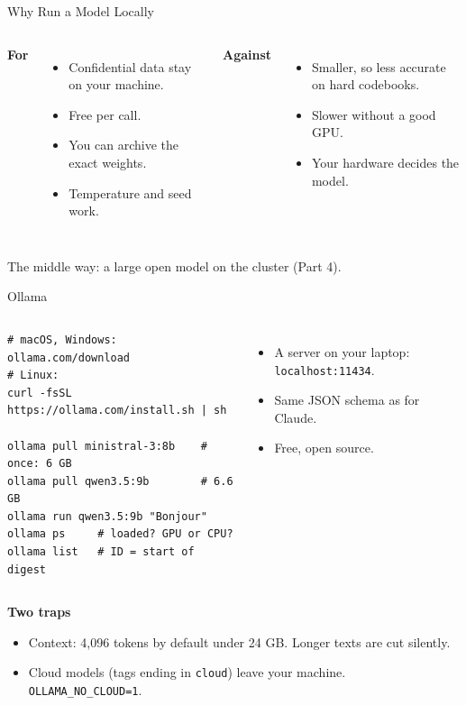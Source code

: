 \documentclass[svgnames,x11names,dvipsnames]{beamer}
\begin{document}
\begin{frame}{Why Run a Model Locally}
\small
\begin{columns}[T]
\textbf{For}
\begin{itemize}
    \setlength{\itemsep}{5pt}
    \item Confidential data stay on your machine.
    \item Free per call.
    \item You can archive the exact weights.
    \item Temperature and seed work.
\end{itemize}
\textbf{Against}
\begin{itemize}
    \setlength{\itemsep}{5pt}
    \item Smaller, so less accurate on hard codebooks.
    \item Slower without a good GPU.
    \item Your hardware decides the model.
\end{itemize}
\end{columns}

\vspace{0.7cm}
\centering
The middle way: a large open model on the cluster (Part 4).
\end{frame}

\begin{frame}[fragile]{Ollama}
\vspace{0.1cm}
\begin{columns}[T]
{\scriptsize
\begin{verbatim}
# macOS, Windows: ollama.com/download
# Linux:
curl -fsSL https://ollama.com/install.sh | sh

ollama pull ministral-3:8b    # once: 6 GB
ollama pull qwen3.5:9b        # 6.6 GB
ollama run qwen3.5:9b "Bonjour"
ollama ps     # loaded? GPU or CPU?
ollama list   # ID = start of digest
\end{verbatim}}
\small
\begin{itemize}
    \setlength{\itemsep}{5pt}
    \item A server on your laptop: \texttt{localhost:11434}.
    \item Same JSON schema as for Claude.
    \item Free, open source.
\end{itemize}
\end{columns}

\vspace{0.5cm}
\small
\textbf{Two traps}
\begin{itemize}
    \setlength{\itemsep}{3pt}
    \item Context: 4,096 tokens by default under 24 GB. Longer texts are cut silently.
    \item Cloud models (tags ending in \texttt{cloud}) leave your machine. \texttt{OLLAMA\_NO\_CLOUD=1}.
\end{itemize}
\end{frame}
\end{document}
